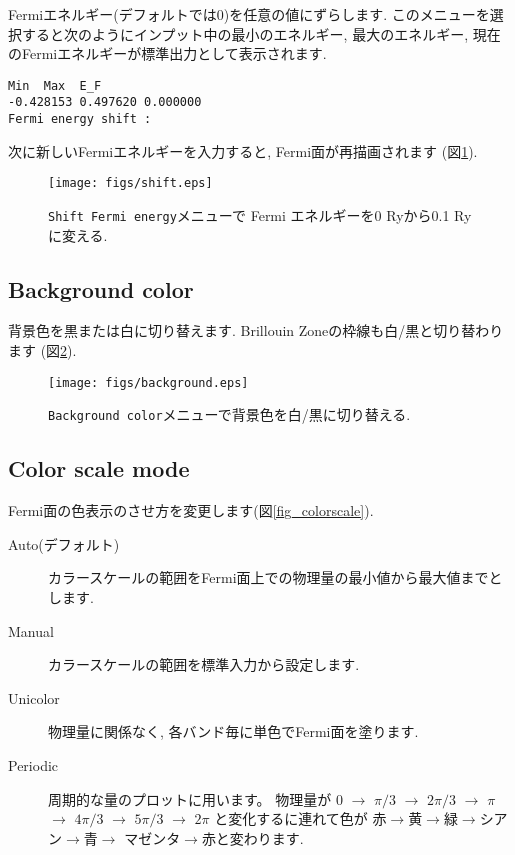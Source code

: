 \documentclass[12pt]{jarticle}
\begin{document}
Fermiエネルギー(デフォルトでは0)を任意の値にずらします.
このメニューを選択すると次のようにインプット中の最小のエネルギー, 
最大のエネルギー, 
現在のFermiエネルギーが標準出力として表示されます. 
\begin{verbatim}
Min  Max  E_F 
-0.428153 0.497620 0.000000 
Fermi energy shift : 
\end{verbatim}
次に新しいFermiエネルギーを入力すると, 
Fermi面が再描画されます (図\ref{fig_shift}).

\begin{figure}[!ht]
  \texttt{[image: figs/shift.eps]}
  \caption{\texttt{Shift Fermi energy}メニューで
    Fermi エネルギーを0 Ryから0.1 Ryに変える.}
  \label{fig_shift}
\end{figure}

\subsection{Background color}

背景色を黒または白に切り替えます. 
Brillouin Zoneの枠線も白/黒と切り替わります (図\ref{fig_background}). 

\begin{figure}[!ht]
  \texttt{[image: figs/background.eps]}
  \caption{\texttt{Background color}メニューで背景色を白/黒に切り替える.}
  \label{fig_background}
\end{figure}

\subsection{Color scale mode}

Fermi面の色表示のさせ方を変更します(図\ref{fig_colorscale}). 
\begin{description}
\item[Auto(デフォルト)] 
  カラースケールの範囲をFermi面上での物理量の最小値から最大値までとします.
\item[Manual] カラースケールの範囲を標準入力から設定します.
\item[Unicolor] 物理量に関係なく, 各バンド毎に単色でFermi面を塗ります.
\item[Periodic] 周期的な量のプロットに用います。
  物理量が
  0 $\rightarrow$ $\pi/3$ $\rightarrow$ $2\pi/3$ $\rightarrow$ $\pi$ $\rightarrow$ 
  $4\pi/3$ $\rightarrow$ $5\pi/3$ $\rightarrow$ $2\pi$
  と変化するに連れて色が
  赤$\rightarrow$黄$\rightarrow$緑$\rightarrow$シアン$\rightarrow$青$\rightarrow$
  マゼンタ$\rightarrow$赤と変わります. 
\end{description}
\end{document}
